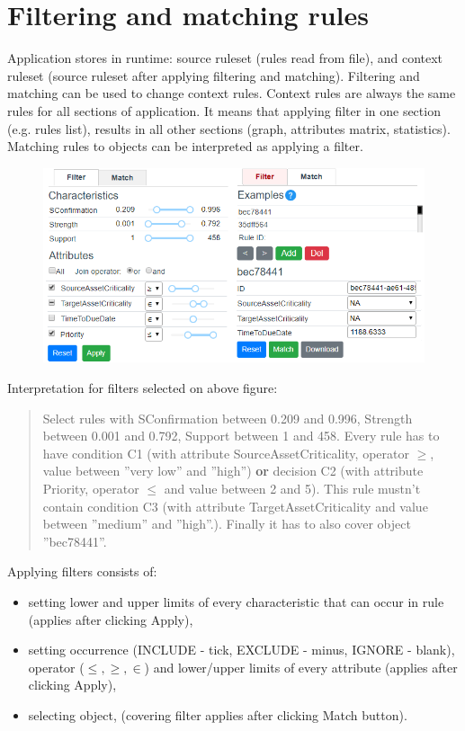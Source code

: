 \documentclass[12pt]{article}
\begin{document}
\section{Filtering and matching rules}

Application stores in runtime: source ruleset (rules read from file), and context ruleset (source ruleset after applying filtering and matching). Filtering and matching can be used to change context rules. Context rules are always the same rules for all sections of application. It means that applying filter in one section (e.g. rules list), results in all other sections (graph, attributes matrix, statistics). Matching rules to objects can be interpreted as applying a filter.

\begin{figure}[H]
    \centering
    \includegraphics[width=\textwidth]{figures/B-filtering.png}
\end{figure}

Interpretation for filters selected on above figure:
\begin{quote}Select rules with SConfirmation between 0.209 and 0.996, Strength between 0.001 and 0.792, Support between 1 and 458. Every rule has to have condition C1 (with attribute SourceAssetCriticality, operator $\ge$, value between ''very low'' and ''high'') \textbf{or} decision C2 (with attribute Priority, operator $\le$ and value between 2 and 5). This rule mustn't contain condition C3 (with attribute TargetAssetCriticality and value between ''medium'' and ''high''.). Finally it has to also cover object ''bec78441''.
\end{quote}

Applying filters consists of:
\begin{itemize}
    \setlength\itemsep{0em}
    \item setting lower and upper limits of every characteristic that can occur in rule (applies after clicking Apply),
    \item setting occurrence (INCLUDE - tick, EXCLUDE - minus, IGNORE - blank), operator ($\le, \ge, \in$) and lower/upper limits of every attribute (applies after clicking Apply),
    \item selecting object, (covering filter applies after clicking Match button).
\end{itemize}
\end{document}
